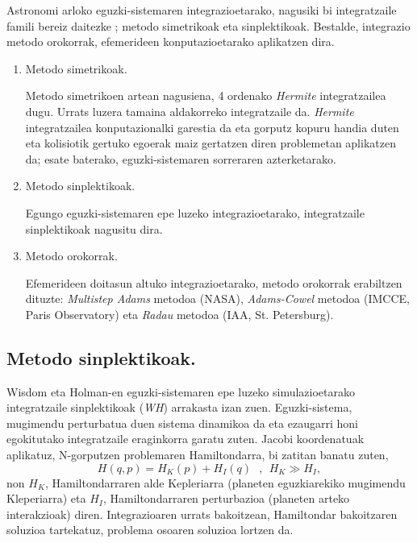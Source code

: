 Astronomi arloko eguzki-sistemaren integrazioetarako, nagusiki bi integratzaile famili bereiz daitezke \cite{Ito2007}; metodo simetrikoak eta sinplektikoak. Bestalde, integrazio metodo orokorrak, efemerideen konputazioetarako aplikatzen dira. 
\begin{enumerate}
\item Metodo simetrikoak.

Metodo simetrikoen artean nagusiena, 4 ordenako \emph{Hermite}  integratzailea \cite{Aarseth2008} dugu.
Urrats luzera tamaina aldakorreko integratzaile da.  \emph{Hermite} integratzailea konputazionalki garestia da eta gorputz kopuru handia duten eta kolisiotik gertuko egoerak maiz gertatzen diren problemetan aplikatzen da; esate baterako, eguzki-sistemaren sorreraren azterketarako.  

\item Metodo sinplektikoak.

Egungo eguzki-sistemaren epe luzeko integrazioetarako, integratzaile sinplektikoak nagusitu dira. 

\item Metodo orokorrak.

Efemerideen doitasun altuko integrazioetarako, metodo orokorrak erabiltzen dituzte: \emph{Multistep Adams} metodoa (NASA), \emph{Adams-Cowel} metodoa (IMCCE, Paris Observatory) eta \emph{Radau} metodoa (IAA, St. Petersburg). 

\end{enumerate}


\subsection*{Metodo sinplektikoak.}

Wisdom eta Holman-en \cite[1991]{Sussman1992} eguzki-sistemaren epe luzeko simulazioetarako integratzaile  sinplektikoak (\emph{WH}) arrakasta izan zuen. Eguzki-sistema, mugimendu perturbatua duen sistema dinamikoa da eta ezaugarri honi egokitutako integratzaile eraginkorra garatu zuten. Jacobi koordenatuak  aplikatuz, N-gorputzen problemaren Hamiltondarra, bi zatitan banatu zuten,
\begin{equation*}
H(q,p)=H_K(p)+H_I(q) \ \ \ , \ \ H_K\gg H_I,
\end{equation*}
non $H_K$, Hamiltondarraren alde Kepleriarra (planeten eguzkiarekiko mugimendu Kleperiarra) eta $H_I$, Hamiltondarraren perturbazioa (planeten arteko interakzioak) diren. Integrazioaren urrats bakoitzean, Hamiltondar bakoitzaren soluzioa tartekatuz, problema osoaren soluzioa lortzen da.  

